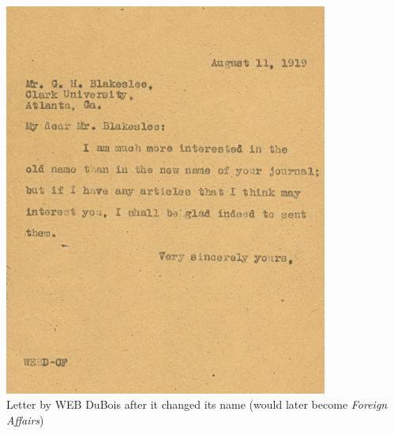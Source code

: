 \documentclass[aspectratio=43]{beamer}
\begin{document}
\begin{frame}
\begin{minipage}{0.49\textwidth}
  \includegraphics[width = 0.8\textwidth]{img/dubois_letter}\\{\small Letter by WEB DuBois after it changed its name (would later become \textit{Foreign Affairs})}
\end{minipage}

\end{frame}
\end{document}
